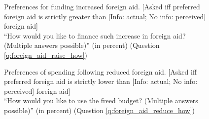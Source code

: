 \documentclass[12pt,english]{article}
\begin{document}
\begin{figure}[h!]
    \caption[Preferences for funding increased foreign aid]{Preferences for funding increased foreign aid. [Asked iff preferred foreign aid is strictly greater than [Info: actual; No info: perceived] foreign aid] \\ ``How would you like to finance such increase in foreign aid? (Multiple answers possible)'' (in percent) (Question \ref{q:foreign_aid_raise_how})}\label{fig:foreign_aid_raise_how}
\end{figure}

\begin{figure}[h!]
    \caption[Preferences of spending following reduced foreign aid]{Preferences of spending following reduced foreign aid. [Asked iff preferred foreign aid is strictly lower than [Info: actual; No info: perceived] foreign aid] \\ ``How would you like to use the freed budget? (Multiple answers possible)'' (in percent) (Question \ref{q:foreign_aid_reduce_how})}\label{fig:foreign_aid_reduce_how}
\end{figure}
\end{document}
